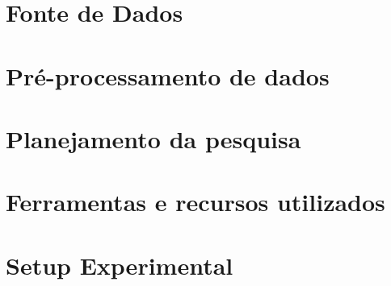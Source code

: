 
\chapter{Fonte de Dados}
\chapter{Pré-processamento de dados}
\chapter{Planejamento da pesquisa}
\chapter{Ferramentas e recursos utilizados}
\chapter{Setup Experimental}